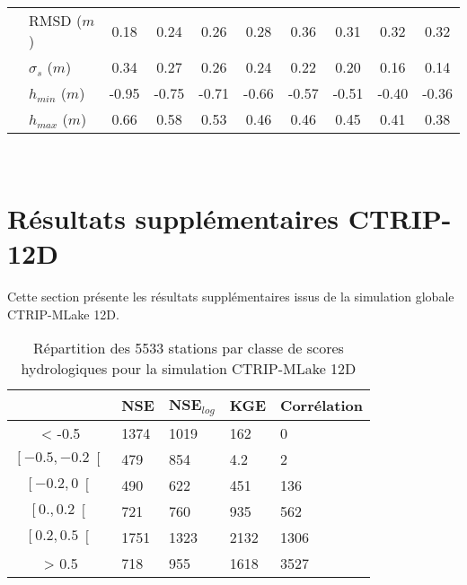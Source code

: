 \begin{table}[h!]
\begin{tabular*}{\linewidth}{ @{\extracolsep{\fill}} ll *{8}c @{}}
                         & RMSD ($m$) & 0.18 & 0.24 & 0.26 & 0.28 & 0.36 & 0.31 & 0.32 & 0.32  \\
                         & $\sigma_{s}$ ($m$) & 0.34 & 0.27 & 0.26 & 0.24 & 0.22 & 0.20 & 0.16 & 0.14  \\
                         & $h_{min}$ ($m$) & -0.95 & -0.75 & -0.71 & -0.66 & -0.57 & -0.51 & -0.40 & -0.36   \\
                         & $h_{max}$ ($m$) & 0.66 & 0.58 & 0.53 & 0.46 & 0.46 & 0.45 & 0.41 & 0.38  \\
\bottomrule
\end{tabular*}
\end{table}

~\\
\cleardoublepage

\section{{\selectfont Résultats supplémentaires CTRIP-12D}}
\label{chap:supplement_ctrip12d} 

Cette section présente les résultats supplémentaires issus de la simulation globale CTRIP-MLake 12D.

\begin{table}[h!]
 \caption{Répartition des 5533 stations par classe de scores hydrologiques pour la simulation CTRIP-MLake 12D}
 \label{tab_repartition_12d}
 \begin{tabularx}{\textwidth}{cXXXX}
 \hline
 & NSE & NSE$_{log}$ & KGE & Corrélation\\
 \hline
  < -0.5 &1374&1019&162&0\\
 $\left[-0.5,-0.2\right[$ &479&854&4.2&2\\
 $\left[-0.2,0\right[$&490&622&451&136\\
 $\left[0.,0.2\right[$&721&760&935&562\\ 
 $\left[0.2,0.5\right[$&1751&1323&2132&1306\\
  > 0.5 &718&955&1618&3527\\
 \hline
 \end{tabularx}
\end{table}

~\\

